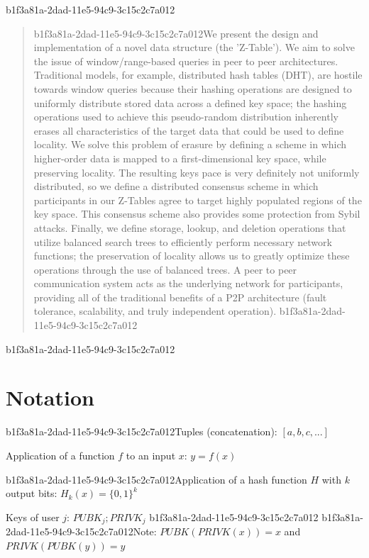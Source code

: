 \documentclass[12pt]{article}
\begin{document}
b1f3a81a-2dad-11e5-94c9-3c15c2c7a012\maketitle

\begin{abstract}
b1f3a81a-2dad-11e5-94c9-3c15c2c7a012We present the design and implementation of a novel data structure (the 'Z-Table'). We aim to solve the issue of window/range-based queries in peer to peer architectures. Traditional models, for example,  distributed hash tables (DHT), are hostile towards window queries because their hashing operations are designed to uniformly distribute stored data across a defined key space; the hashing operations used to achieve this pseudo-random distribution inherently erases all characteristics of the target data that could be used to define locality. We solve this problem of erasure by defining a scheme in which higher-order data is mapped to a first-dimensional key space, while preserving locality. The resulting keys pace is very definitely not uniformly distributed, so we define a distributed consensus scheme in which participants in our Z-Tables agree to target highly populated regions of the key space. This consensus scheme also provides some protection from Sybil attacks. Finally, we define storage, lookup, and deletion operations that utilize balanced search trees to efficiently perform necessary network functions; the preservation of locality allows us to greatly optimize these operations through the use of balanced trees. A peer to peer communication system acts as the underlying network for participants, providing all of the traditional benefits of a P2P architecture (fault tolerance, scalability, and truly independent operation).
b1f3a81a-2dad-11e5-94c9-3c15c2c7a012\end{abstract}
b1f3a81a-2dad-11e5-94c9-3c15c2c7a012
\section{Notation}

b1f3a81a-2dad-11e5-94c9-3c15c2c7a012Tuples (concatenation): $[a,b,c,...]$

Application of a function $f$ to an input $x$: $y=f(x)$

b1f3a81a-2dad-11e5-94c9-3c15c2c7a012Application of a hash function $H$ with $k$ output bits: $H_{k}(x) = \{0,1\}^k$

Keys of user $j$: $ PUBK_j; PRIVK_j $
b1f3a81a-2dad-11e5-94c9-3c15c2c7a012
b1f3a81a-2dad-11e5-94c9-3c15c2c7a012Note: $PUBK(PRIVK(x)) = x$ and $PRIVK(PUBK(y)) = y$~
\end{document}
